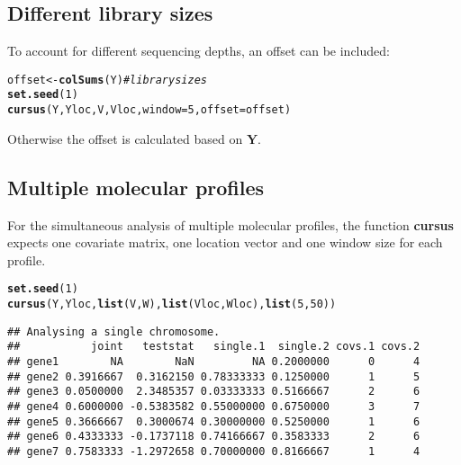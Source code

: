\documentclass{article}\usepackage[]{graphicx}\usepackage[]{color}
\makeatletter
\newcommand{\hlnum}[1]{\textcolor[rgb]{0.686,0.059,0.569}{#1}}%
\newcommand{\hlcom}[1]{\textcolor[rgb]{0.678,0.584,0.686}{\textit{#1}}}%
\newcommand{\hlstd}[1]{\textcolor[rgb]{0.345,0.345,0.345}{#1}}%
\newcommand{\hlkwb}[1]{\textcolor[rgb]{0.69,0.353,0.396}{#1}}%
\newcommand{\hlkwc}[1]{\textcolor[rgb]{0.333,0.667,0.333}{#1}}%
\newcommand{\hlkwd}[1]{\textcolor[rgb]{0.737,0.353,0.396}{\textbf{#1}}}%
\newenvironment{kframe}{%
 \def\at@end@of@kframe{}%
 \ifinner\ifhmode%
  \def\at@end@of@kframe{\end{minipage}}%
  \begin{minipage}{\columnwidth}%
 \fi\fi%
 \def\FrameCommand##1{\hskip\@totalleftmargin \hskip-\fboxsep
 \colorbox{shadecolor}{##1}\hskip-\fboxsep
     \hskip-\linewidth \hskip-\@totalleftmargin \hskip\columnwidth}%
 \MakeFramed {\advance\hsize-\width
   \@totalleftmargin\z@ \linewidth\hsize
   \@setminipage}}%
 {\par\unskip\endMakeFramed%
 \at@end@of@kframe}
\newenvironment{knitrout}{}{} %
\makeatother
\begin{document}
\subsection{Different library sizes}
\label{GWA Different library sizes}

To account for different sequencing depths, an offset can be included:
\begin{knitrout}
\color{fgcolor}\begin{kframe}
\begin{alltt}
\hlstd{offset} \hlkwb{<-} \hlkwd{colSums}\hlstd{(Y)} \hlcom{# library sizes}
\hlkwd{set.seed}\hlstd{(}\hlnum{1}\hlstd{)}
\hlkwd{cursus}\hlstd{(Y,Yloc,V,Vloc,}\hlkwc{window}\hlstd{=}\hlnum{5}\hlstd{,}\hlkwc{offset}\hlstd{=offset)}
\end{alltt}
\end{kframe}
\end{knitrout}
Otherwise the offset is calculated based on $\boldsymbol{Y}$.

\newpage

\subsection{Multiple molecular profiles}
\label{GWA Multiple molecular profiles}

For the simultaneous analysis of multiple molecular profiles, the function \textbf{cursus} expects one covariate matrix, one location vector and one window size for each profile.

\begin{knitrout}
\color{fgcolor}\begin{kframe}
\begin{alltt}
\hlkwd{set.seed}\hlstd{(}\hlnum{1}\hlstd{)}
\hlkwd{cursus}\hlstd{(Y,Yloc,}\hlkwd{list}\hlstd{(V,W),}\hlkwd{list}\hlstd{(Vloc,Wloc),}\hlkwd{list}\hlstd{(}\hlnum{5}\hlstd{,}\hlnum{50}\hlstd{))}
\end{alltt}
\begin{verbatim}
## Analysing a single chromosome.
##           joint   teststat   single.1  single.2 covs.1 covs.2
## gene1        NA        NaN         NA 0.2000000      0      4
## gene2 0.3916667  0.3162150 0.78333333 0.1250000      1      5
## gene3 0.0500000  2.3485357 0.03333333 0.5166667      2      6
## gene4 0.6000000 -0.5383582 0.55000000 0.6750000      3      7
## gene5 0.3666667  0.3000674 0.30000000 0.5250000      1      6
## gene6 0.4333333 -0.1737118 0.74166667 0.3583333      2      6
## gene7 0.7583333 -1.2972658 0.70000000 0.8166667      1      4
\end{verbatim}
\end{kframe}
\end{knitrout}
\end{document}
